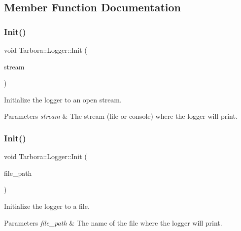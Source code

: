 \subsection{Member Function Documentation}
\mbox{\label{classTarbora_1_1Logger_a55be0d3eeea01a9fbb0a26e029451411}} 
\subsubsection{\texorpdfstring{Init()}{Init()}\hspace{0.1cm}{\footnotesize\ttfamily [1/2]}}
{\footnotesize\ttfamily void Tarbora\+::\+Logger\+::\+Init (\begin{DoxyParamCaption}\item[{F\+I\+LE $\ast$}]{stream }\end{DoxyParamCaption})\hspace{0.3cm}{\ttfamily [static]}}



Initialize the logger to an open stream. 


\begin{DoxyParams}{Parameters}
{\em stream} & The stream (file or console) where the logger will print. \\
\hline
\end{DoxyParams}
\mbox{\label{classTarbora_1_1Logger_af5cc4f3b068f2bde26943da40e1d6e91}} 
\subsubsection{\texorpdfstring{Init()}{Init()}\hspace{0.1cm}{\footnotesize\ttfamily [2/2]}}
{\footnotesize\ttfamily void Tarbora\+::\+Logger\+::\+Init (\begin{DoxyParamCaption}\item[{const char $\ast$}]{file\+\_\+path }\end{DoxyParamCaption})\hspace{0.3cm}{\ttfamily [static]}}



Initialize the logger to a file. 


\begin{DoxyParams}{Parameters}
{\em file\+\_\+path} & The name of the file where the logger will print. \\
\hline
\end{DoxyParams}
\mbox{\label{classTarbora_1_1Logger_aa32641fca455178d88f3b1c8b2f552ab}} 
